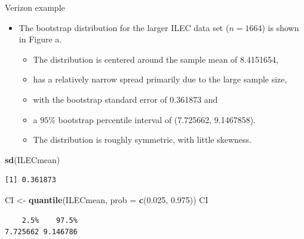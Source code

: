 \documentclass[
  ignorenonframetext,
]{beamer}
\newenvironment{Shaded}{\begin{snugshade}}{\end{snugshade}}
\newcommand{\AttributeTok}[1]{\textcolor[rgb]{0.13,0.29,0.53}{#1}}
\newcommand{\FloatTok}[1]{\textcolor[rgb]{0.00,0.00,0.81}{#1}}
\newcommand{\FunctionTok}[1]{\textcolor[rgb]{0.13,0.29,0.53}{\textbf{#1}}}
\newcommand{\NormalTok}[1]{#1}
\newcommand{\OtherTok}[1]{\textcolor[rgb]{0.56,0.35,0.01}{#1}}
\providecommand{\tightlist}{%
  \setlength{\itemsep}{0pt}\setlength{\parskip}{0pt}}
\begin{document}
\begin{frame}[fragile]{Verizon example}
\protect\hypertarget{verizon-example-3}{}
\begin{itemize}
\item
  The bootstrap distribution for the larger ILEC data set (\(n=1664\))
  is shown in Figure a.

  \begin{itemize}
  \tightlist
  \item
    The distribution is centered around the sample mean of 8.4151654,
  \item
    has a relatively narrow spread primarily due to the large sample
    size,
  \item
    with the bootstrap standard error of 0.361873 and
  \item
    a \(95\%\) bootstrap percentile interval of (7.725662, 9.1467858).
  \item
    The distribution is roughly symmetric, with little skewness.
  \end{itemize}
\end{itemize}

\tiny

\begin{Shaded}
\begin{Highlighting}[]
\FunctionTok{sd}\NormalTok{(ILECmean)}
\end{Highlighting}
\end{Shaded}

\begin{verbatim}
[1] 0.361873
\end{verbatim}

\begin{Shaded}
\begin{Highlighting}[]
\NormalTok{CI }\OtherTok{\textless{}{-}} \FunctionTok{quantile}\NormalTok{(ILECmean, }\AttributeTok{prob =} \FunctionTok{c}\NormalTok{(}\FloatTok{0.025}\NormalTok{, }\FloatTok{0.975}\NormalTok{))}
\NormalTok{CI}
\end{Highlighting}
\end{Shaded}

\begin{verbatim}
    2.5%    97.5% 
7.725662 9.146786 
\end{verbatim}

\normalsize
\end{frame}
\end{document}
